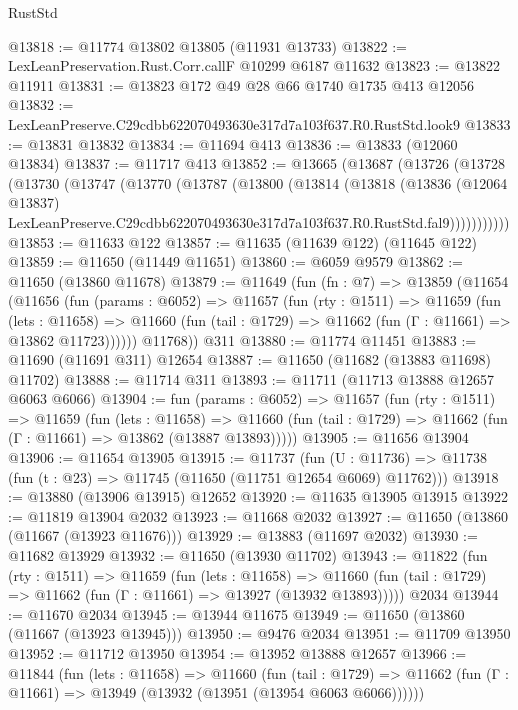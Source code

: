\begin{lexlean}{RustStd}
\begin{coremodule}
@13818 := @11774 @13802 @13805 (@11931 @13733)
@13822 := LexLeanPreservation.Rust.Corr.callF @10299 @6187 @11632
@13823 := @13822 @11911
@13831 := @13823 @172 @49 @28 @66 @1740 @1735 @413 @12056
@13832 := LexLeanPreserve.C29cdbb622070493630e317d7a103f637.R0.RustStd.look9
@13833 := @13831 @13832
@13834 := @11694 @413
@13836 := @13833 (@12060 @13834)
@13837 := @11717 @413
@13852 := @13665
    (@13687
      (@13726
        (@13728
          (@13730
            (@13747
              (@13770
                (@13787
                  (@13800
                    (@13814
                      (@13818
                        (@13836
                          (@12064 @13837)
                          LexLeanPreserve.C29cdbb622070493630e317d7a103f637.R0.RustStd.fal9)))))))))))
@13853 := @11633 @122
@13857 := @11635 (@11639 @122) (@11645 @122)
@13859 := @11650 (@11449 @11651)
@13860 := @6059 @9579
@13862 := @11650 (@13860 @11678)
@13879 := @11649
    (fun (fn : @7) =>
    @13859
      (@11654
        (@11656
          (fun (params : @6052) =>
          @11657
            (fun (rty : @1511) =>
            @11659
              (fun (lets : @11658) =>
              @11660 (fun (tail : @1729) => @11662 (fun (Γ : @11661) => @13862 @11723))))))
        @11768))
    @311
@13880 := @11774 @11451
@13883 := @11690 (@11691 @311) @12654
@13887 := @11650 (@11682 (@13883 @11698) @11702)
@13888 := @11714 @311
@13893 := @11711 (@11713 @13888 @12657 @6063 @6066)
@13904 := fun (params : @6052) =>
  @11657
    (fun (rty : @1511) =>
    @11659
      (fun (lets : @11658) =>
      @11660 (fun (tail : @1729) => @11662 (fun (Γ : @11661) => @13862 (@13887 @13893)))))
@13905 := @11656 @13904
@13906 := @11654 @13905
@13915 := @11737
    (fun (U : @11736) => @11738 (fun (t : @23) => @11745 (@11650 (@11751 @12654 @6069) @11762)))
@13918 := @13880 (@13906 @13915) @12652
@13920 := @11635 @13905 @13915
@13922 := @11819 @13904 @2032
@13923 := @11668 @2032
@13927 := @11650 (@13860 (@11667 (@13923 @11676)))
@13929 := @13883 (@11697 @2032)
@13930 := @11682 @13929
@13932 := @11650 (@13930 @11702)
@13943 := @11822
    (fun (rty : @1511) =>
    @11659
      (fun (lets : @11658) =>
      @11660 (fun (tail : @1729) => @11662 (fun (Γ : @11661) => @13927 (@13932 @13893)))))
    @2034
@13944 := @11670 @2034
@13945 := @13944 @11675
@13949 := @11650 (@13860 (@11667 (@13923 @13945)))
@13950 := @9476 @2034
@13951 := @11709 @13950
@13952 := @11712 @13950
@13954 := @13952 @13888 @12657
@13966 := @11844
    (fun (lets : @11658) =>
    @11660
      (fun (tail : @1729) =>
      @11662 (fun (Γ : @11661) => @13949 (@13932 (@13951 (@13954 @6063 @6066))))))

\end{coremodule}
\end{lexlean}

